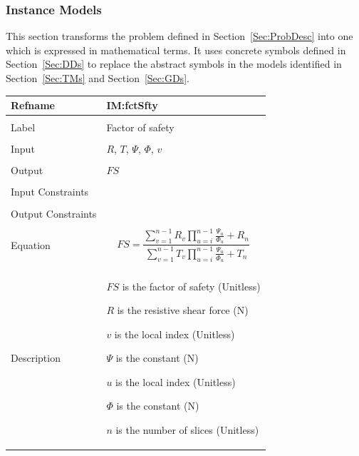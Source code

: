 \documentclass[12pt]{article}
\begin{document}
\subsubsection{Instance Models}
\label{Sec:IMs}
This section transforms the problem defined in Section~\ref{Sec:ProbDesc} into one which is expressed in mathematical terms. It uses concrete symbols defined in Section~\ref{Sec:DDs} to replace the abstract symbols in the models identified in Section~\ref{Sec:TMs} and Section~\ref{Sec:GDs}.
~\newline
\noindent \begin{minipage}{\textwidth}
\begin{tabular}{p{} p{}}
\toprule \textbf{Refname} & \textbf{IM:fctSfty}
\label{IM:fctSfty}
\\ \midrule \\
Label & Factor of safety
\\ \midrule \\
Input & $R$, $T$, $Ψ$, $Φ$, $v$
\\ \midrule \\
Output & $FS$
\\ \midrule \\
Input Constraints & 
\\ \midrule \\
Output Constraints & 
\\ \midrule \\
Equation & \begin{dmath}
           FS=\frac{\displaystyle\sum_{v=1}^{n-1}{R_{v} \displaystyle\prod_{u=i}^{n-1}{\frac{Ψ_{u}}{Φ_{u}}}}+R_{n}}{\displaystyle\sum_{v=1}^{n-1}{T_{v} \displaystyle\prod_{u=i}^{n-1}{\frac{Ψ_{u}}{Φ_{u}}}}+T_{n}}
           \end{dmath}
\\ \midrule \\
Description & \begin{symbDescription}
              \item{$FS$ is the factor of safety (Unitless)}
              \item{$R$ is the resistive shear force (N)}
              \item{$v$ is the local index (Unitless)}
              \item{$Ψ$ is the constant (N)}
              \item{$u$ is the local index (Unitless)}
              \item{$Φ$ is the constant (N)}
              \item{$n$ is the number of slices (Unitless)}

\end{symbDescription}
\end{tabular}
\end{minipage}
\end{document}
